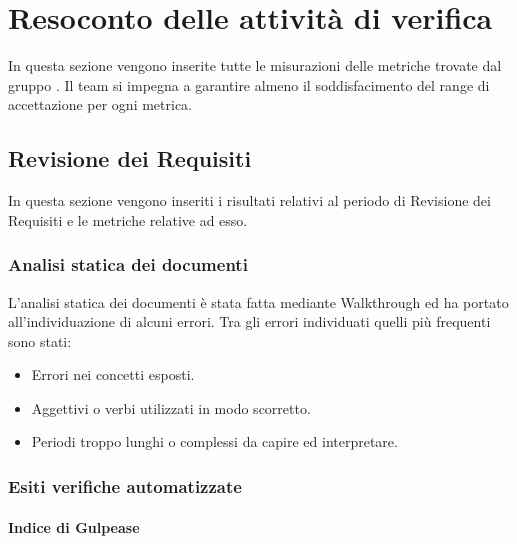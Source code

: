 \section{Resoconto delle attività di verifica}

In questa sezione vengono inserite tutte le misurazioni delle metriche trovate dal gruppo \gruppo.
Il team si impegna a garantire almeno il soddisfacimento del range di accettazione per ogni metrica.


\subsection{Revisione dei Requisiti}
In questa sezione vengono inseriti i risultati relativi al periodo di Revisione dei Requisiti e le metriche relative ad esso.

\subsubsection{Analisi statica dei documenti}
L'analisi statica dei documenti è stata fatta mediante Walkthrough ed ha portato all'individuazione di alcuni errori. Tra gli errori individuati quelli più frequenti sono stati:
		\begin{itemize}
			\item Errori nei concetti esposti.
			\item Aggettivi o verbi utilizzati in modo scorretto.
			\item Periodi troppo lunghi o complessi da capire ed interpretare.
		\end{itemize}

\subsubsection{Esiti verifiche automatizzate}
		
\paragraph{Indice di Gulpease}

